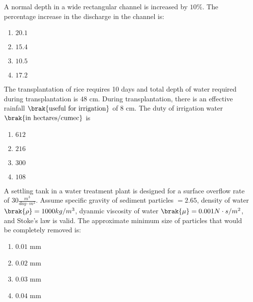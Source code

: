 \iffalse
\chapter{2013}
\author{EE24BTECH11002}
\section{ce}
\fi
    \item A normal depth in a wide rectangular channel is increased by $10\%$. The percentage increase in the discharge in the channel is:
	\hfill{}

	\begin{enumerate}
		\item $20.1$
		\item $15.4$
		\item $10.5$
		\item $17.2$
	\end{enumerate}

    \item The transplantation of rice requires 10 days and total depth of water required during transplantation is $48$ cm. During transplantation, there is an effective rainfall $\brak{\text{useful for irrigation}}$ of $8$ cm. The duty of irrigation water $\brak{\text{in hectares/cumec}}$ is
	\hfill{}

	\begin{enumerate}
		\item $612$
		\item $216$
		\item $300$
		\item $108$
	\end{enumerate}

    \item A settling tank in a water treatment plant is designed for a surface overflow rate of $30 \frac{m^3}{day\cdot m^2}$. Assume specific gravity of sediment particles $= 2.65$, density of water $\brak{\rho} = 1000 kg/m^3$, dyanmic viscosity of water $\brak{\mu} = 0.001 N\cdot s/m^2$, and Stoke's law is valid. The approximate minimum size of particles that would be completely removed is:
	\hfill{}

	\begin{enumerate}
		\item $0.01$ mm
		\item $0.02$ mm
		\item $0.03$ mm
		\item $0.04$ mm
	\end{enumerate}


